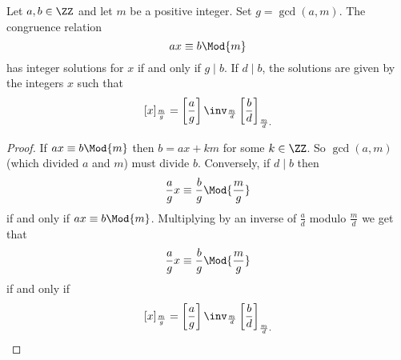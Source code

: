 \documentclass[12pt, a4paper]{article}
\begin{document}
\begin{proposition}
    Let \(a,b \in \ZZ\) and let \(m\) be a positive integer. Set \(g=\gcd(a,m)\). The congruence relation 
    \[ax \equiv b \Mod{m}\]
    has integer solutions for \(x\) if and only if \(g \mid b\).
    If \(d\mid b\), the solutions are given by the integers \(x\) such that 
    \[
        [x]_{\frac{m}{g}} = \left[\frac{a}{g}\right]\inv_{\frac{m}{d}} \left[ \frac{b}{d} \right]_{\frac{m}{d}.}
    \]
\end{proposition}

\begin{proof}
    If \(ax \equiv b \Mod{m}\) then \(b=ax+km\) for some \(k\in \ZZ\). So \(\gcd(a,m)\) (which divided \(a\) and \(m\)) must divide \(b\). Conversely, if \(d\mid b\) then 
    \[\frac{a}{g}x \equiv \frac{b}{g} \Mod{\frac{m}{g}}\]
    if and only if \(ax\equiv b \Mod{m}\). Multiplying by an inverse of \(\frac{a}{d}\) modulo \(\frac{m}{d}\) we get that 
    \[\frac{a}{g}x \equiv \frac{b}{g} \Mod{\frac{m}{g}}\]
    if and only if 
    \[
        [x]_{\frac{m}{g}} = \left[\frac{a}{g}\right]\inv_{\frac{m}{d}} \left[ \frac{b}{d} \right]_{\frac{m}{d}.}
    \]
\end{proof}
\end{document}
